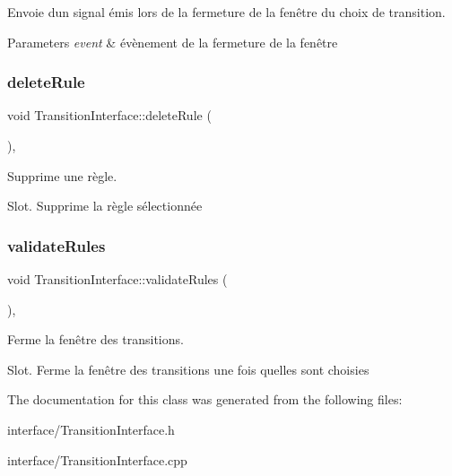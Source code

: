 Envoie d\textquotesingle{}un signal émis lors de la fermeture de la fenêtre du choix de transition. 


\begin{DoxyParams}{Parameters}
{\em event} & évènement de la fermeture de la fenêtre \\
\hline
\end{DoxyParams}
\mbox{\label{class_transition_interface_a36900078169dc2f7b37f8c89ea499fc0}} 
\subsubsection{\texorpdfstring{delete\+Rule}{deleteRule}}
{\footnotesize\ttfamily void Transition\+Interface\+::delete\+Rule (\begin{DoxyParamCaption}{ }\end{DoxyParamCaption})\hspace{0.3cm}{\ttfamily [protected]}, {\ttfamily [slot]}}



Supprime une règle. 

Slot. Supprime la règle sélectionnée \mbox{\label{class_transition_interface_a3db0ae462c81b5251ce89759c52d8103}} 
\subsubsection{\texorpdfstring{validate\+Rules}{validateRules}}
{\footnotesize\ttfamily void Transition\+Interface\+::validate\+Rules (\begin{DoxyParamCaption}{ }\end{DoxyParamCaption})\hspace{0.3cm}{\ttfamily [protected]}, {\ttfamily [slot]}}



Ferme la fenêtre des transitions. 

Slot. Ferme la fenêtre des transitions une fois qu\textquotesingle{}elles sont choisies 

The documentation for this class was generated from the following files\+:\begin{DoxyCompactItemize}
\item 
interface/Transition\+Interface.\+h\item 
interface/Transition\+Interface.\+cpp\end{DoxyCompactItemize}
